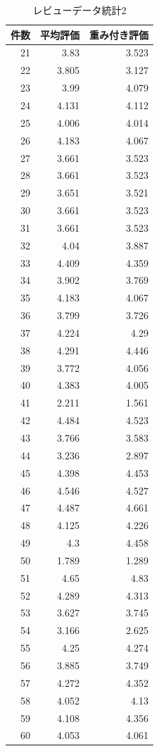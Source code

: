 \clearpage





\begin{table}[htb]
\label{reviewtoukei2}
  \begin{center}
    \caption{レビューデータ統計2}


\begin{tabular}{|r|r|r|}

\hline
件数 & 平均評価 & 重み付き評価 \\
\hline\hline

21 &3.83 &3.523\\
22 &3.805 &3.127\\
23 &3.99 &4.079\\
24 &4.131 &4.112\\
25 &4.006 &4.014\\
26 &4.183 &4.067\\
27 &3.661 &3.523\\
28 &3.661 &3.523\\
29 &3.651 &3.521\\
30 &3.661 &3.523\\
31 &3.661 &3.523\\
32 &4.04 &3.887\\
33 &4.409 &4.359\\
34 &3.902 &3.769\\
35 &4.183 &4.067\\
36 &3.799 &3.726\\
37 &4.224 &4.29\\
38 &4.291 &4.446\\
39 &3.772 &4.056\\
40 &4.383 &4.005\\
41 &2.211 &1.561\\
42 &4.484 &4.523\\
43 &3.766 &3.583\\
44 &3.236 &2.897\\
45 &4.398 &4.453\\
46 &4.546 &4.527\\
47 &4.487 &4.661\\
48 &4.125 &4.226\\
49 &4.3 &4.458\\
50 &1.789 &1.289\\
51 &4.65 &4.83\\
52 &4.289 &4.313\\
53 &3.627 &3.745\\
54 &3.166 &2.625\\
55 &4.25 &4.274\\
56 &3.885 &3.749\\
57 &4.272 &4.352\\
58 &4.052 &4.13\\
59 &4.108 &4.356\\
60 &4.053 &4.061\\


	\hline
    \end{tabular}
  \end{center}
\end{table}



